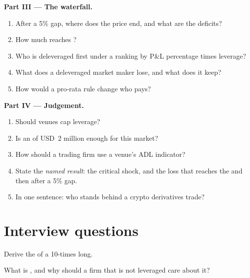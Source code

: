 \begin{problem}
\medskip\noindent\textbf{Part III --- The waterfall.}
\begin{enumerate}[resume]
\item After a 5\% gap, where does the price end, and what are the deficits?
\item How much reaches ?
\item Who is deleveraged first under a ranking by P\&L percentage times leverage?
\item What does a deleveraged market maker lose, and what does it keep?
\item How would a pro-rata rule change who pays?
\end{enumerate}

\medskip\noindent\textbf{Part IV --- Judgement.}
\begin{enumerate}[resume]
\item Should venues cap leverage?
\item Is an  of USD~2 million enough for this market?
\item How should a trading firm use a venue's ADL indicator?
\item State the \emph{named result}: the critical shock, and the loss that reaches the  and then
 after a 5\% gap.
\item In one sentence: who stands behind a crypto derivatives trade?
\end{enumerate}
\end{problem}

\section{Interview questions}

\begin{interviewq}\label{iq:m3:margin-liquidation-and-loss-allocation:1}
Derive the  of a 10-times long.
\end{interviewq}

\begin{interviewq}\label{iq:m3:margin-liquidation-and-loss-allocation:2}
What is , and why should a firm that is not leveraged care about it?
\end{interviewq}

